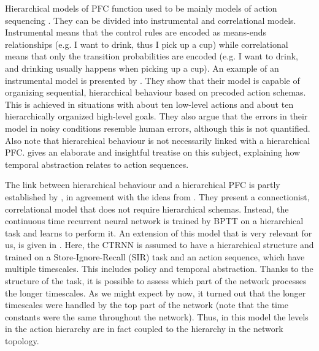 \documentclass[10pt,a4paper]{report}
\begin{document}
Hierarchical models of PFC function used to be mainly models of action sequencing \citep{Allen2010, Dayan2009}. They can be divided into instrumental and correlational models. Instrumental means that the control rules are encoded as means-ends relationships (e.g. I want to drink, thus I pick up a cup) while correlational means that only the transition probabilities are encoded (e.g. I want to drink, and drinking usually happens when picking up a cup). An example of an instrumental model is presented by \citet{Cooper2000}. They show that their model is capable of organizing sequential, hierarchical behaviour based on precoded action schemas. This is achieved in situations with about ten low-level actions and about ten hierarchically organized high-level goals. They also argue that the errors in their model in noisy conditions resemble human errors, although this is not quantified. Also note that hierarchical behaviour is not necessarily linked with a hierarchical PFC. \citet{Uithol2012} gives an elaborate and insightful treatise on this subject, explaining how temporal abstraction relates to action sequences.

The link between hierarchical behaviour and a hierarchical PFC is partly established by \citet{Botvinick2004}, in agreement with the ideas from \citet{Uithol2012}. They present a connectionist, correlational model that does not require hierarchical schemas. Instead, the continuous time recurrent neural network is trained by BPTT on a hierarchical task and learns to perform it. An extension of this model that is very relevant for us, is given in \citet{Botvinick2007}. Here, the CTRNN is assumed to have a hierarchical structure and trained on a Store-Ignore-Recall (SIR) task and an action sequence, which have multiple timescales. This includes policy and temporal abstraction. Thanks to the structure of the task, it is possible to assess which part of the network processes the longer timescales. As we might expect by now, it turned out that the longer timescales were handled by the top part of the network (note that the time constants were the same throughout the network). Thus, in this model the levels in the action hierarchy are in fact coupled to the hierarchy in the network topology.
\end{document}
